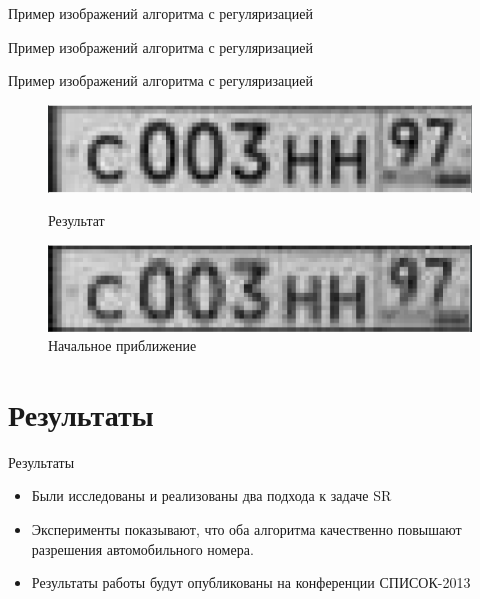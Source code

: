 \begin{frame}{Пример изображений алгоритма с регуляризацией}
  
\end{frame}

\begin{frame}{Пример изображений алгоритма с регуляризацией}
  
\end{frame}

\begin{frame}{Пример изображений алгоритма с регуляризацией}
  \begin{figure}
    \caption{Результат}
    \includegraphics[width=\columnwidth]{content/sr2_two_1.png}\\
  \end{figure}
  \begin{figure}
    \caption{Начальное приближение}
    \includegraphics[width=\columnwidth]{content/sr2_two_2.png}
  \end{figure}
\end{frame}

\section{Результаты}

\begin{frame}{Результаты}
  \begin{itemize}
    \item Были исследованы и реализованы два подхода к задаче SR
    \item Эксперименты показывают, что оба алгоритма качественно повышают разрешения автомобильного
      номера.
    \item Результаты работы будут опубликованы на конференции СПИСОК-2013
  \end{itemize}
\end{frame}
